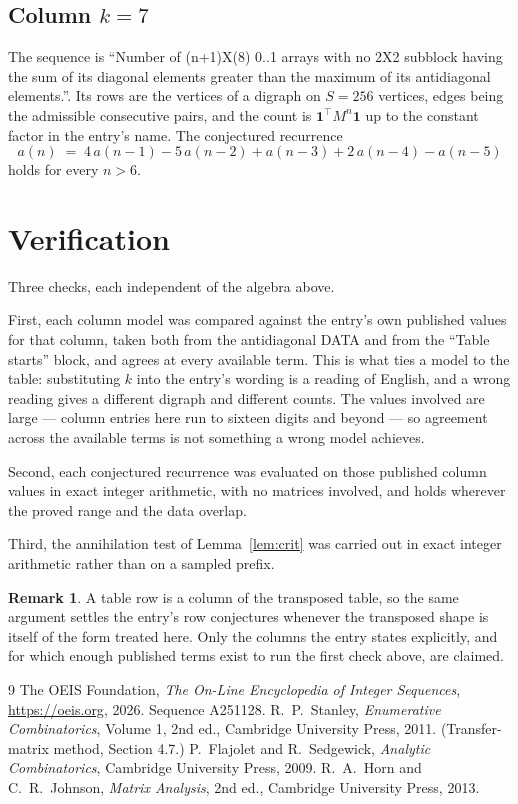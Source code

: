 \documentclass[11pt,a4paper]{article}
\theoremstyle{plain}
\theoremstyle{definition}
\newtheorem{remark}[theorem]{Remark}
\begin{document}
\subsection*{Column $k=7$}
The sequence is ``Number of (n+1)X(8) 0..1 arrays with no 2X2 subblock having the sum of its diagonal elements greater than the maximum of its antidiagonal elements.''. Its rows are the vertices of a digraph on
$S=256$ vertices, edges being the admissible consecutive pairs, and the count is
$\mathbf{1}^{\!\top}M^{n}\mathbf{1}$ up to the constant factor in the entry's name.
The conjectured recurrence
\[
a(n)\;=\;4\,a(n-1) - 5\,a(n-2) + a(n-3) + 2\,a(n-4) - a(n-5)
\]
holds for every $n>6$.

\section{Verification}

Three checks, each independent of the algebra above.

First, each column model was compared against the entry's own published values for that
column, taken both from the antidiagonal DATA and from the ``Table starts'' block, and agrees
at every available term. This is what ties a model to the table: substituting $k$ into the
entry's wording is a reading of English, and a wrong reading gives a different digraph and
different counts. The values involved are large --- column entries here run to sixteen digits
and beyond --- so agreement across the available terms is not something a wrong model
achieves.

Second, each conjectured recurrence was evaluated on those published column values in exact
integer arithmetic, with no matrices involved, and holds wherever the proved range and the
data overlap.

Third, the annihilation test of Lemma~\ref{lem:crit} was carried out in exact integer
arithmetic rather than on a sampled prefix.

\begin{remark}
A table row is a column of the transposed table, so the same argument settles the entry's row
conjectures whenever the transposed shape is itself of the form treated here. Only the columns
the entry states explicitly, and for which enough published terms exist to run the first check
above, are claimed.
\end{remark}

\begin{thebibliography}{9}
 The OEIS Foundation, \emph{The On-Line Encyclopedia of Integer
Sequences}, \url{https://oeis.org}, 2026. Sequence A251128.
 R.~P.~Stanley, \emph{Enumerative Combinatorics}, Volume 1, 2nd ed.,
Cambridge University Press, 2011. (Transfer-matrix method, Section 4.7.)
 P.~Flajolet and R.~Sedgewick, \emph{Analytic Combinatorics}, Cambridge
University Press, 2009.
 R.~A.~Horn and C.~R.~Johnson, \emph{Matrix Analysis}, 2nd ed., Cambridge
University Press, 2013.
\end{thebibliography}
\end{document}
